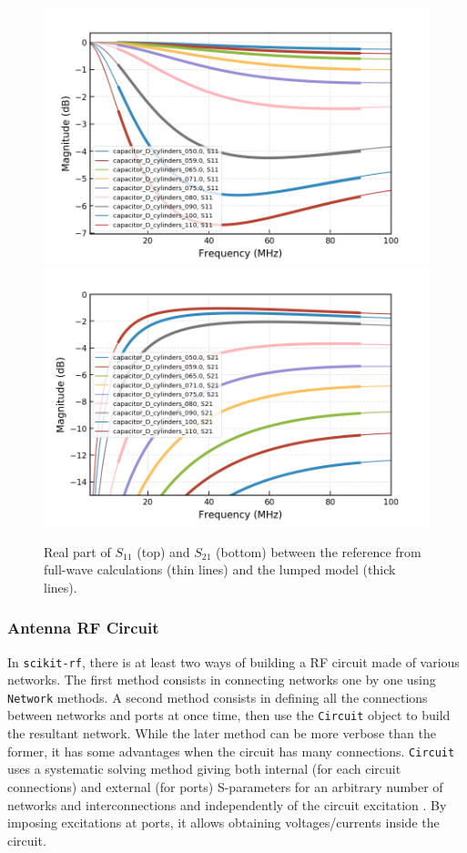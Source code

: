 {\begin{figure}
	\centering
	\includegraphics[width=1.0\linewidth]{figures/chap3/WEST_ICRH/comparison_fullwave_lumped_S11}
	\includegraphics[width=1.0\linewidth]{figures/chap3/WEST_ICRH/comparison_fullwave_lumped_S21}
	\caption{Real part of  $S_{11}$ (top) and $S_{21}$ (bottom) between the reference from full-wave  calculations (thin lines) and the lumped model (thick lines).}
	\label{fig:capacitor_interpolation}
\end{figure}

\clearpage
\subsubsection{Antenna RF Circuit}
In \texttt{scikit-rf}, there is at least two ways of building a RF circuit made of various networks. The first method consists in connecting networks one by one using \texttt{Network} methods. A second method consists in defining all the connections between networks and ports at once time, then use the \texttt{Circuit} object to build the resultant network. While the later method can be more verbose than the former, it has some advantages when the circuit has many connections. \texttt{Circuit} uses a systematic solving method giving both internal (for each circuit connections) and external (for ports) S-parameters for an arbitrary number of networks and interconnections and independently of the circuit excitation . By imposing excitations at ports, it allows obtaining voltages/currents inside the circuit.

}
